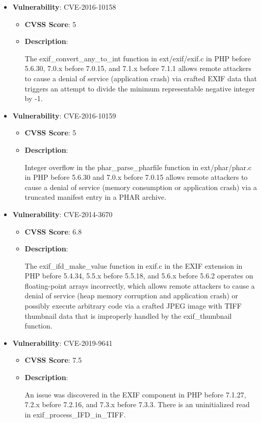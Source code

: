 \documentclass{article}
\begin{document}
\begin{itemize}
        \item \textbf{Vulnerability}: CVE-2016-10158
        \begin{itemize}
            \item \textbf{CVSS Score}:  5 
            \item \textbf{Description}:
            \parbox[t]{0.9\linewidth}{
                \ttfamily The exif\_convert\_any\_to\_int function in ext/exif/exif.c in PHP before 5.6.30, 7.0.x before 7.0.15, and 7.1.x before 7.1.1 allows remote attackers to cause a denial of service (application crash) via crafted EXIF data that triggers an attempt to divide the minimum representable negative integer by -1.
            }
        \end{itemize}
    
        \item \textbf{Vulnerability}: CVE-2016-10159
        \begin{itemize}
            \item \textbf{CVSS Score}:  5 
            \item \textbf{Description}:
            \parbox[t]{0.9\linewidth}{
                \ttfamily Integer overflow in the phar\_parse\_pharfile function in ext/phar/phar.c in PHP before 5.6.30 and 7.0.x before 7.0.15 allows remote attackers to cause a denial of service (memory consumption or application crash) via a truncated manifest entry in a PHAR archive.
            }
        \end{itemize}
    
        \item \textbf{Vulnerability}: CVE-2014-3670
        \begin{itemize}
            \item \textbf{CVSS Score}:  6.8 
            \item \textbf{Description}:
            \parbox[t]{0.9\linewidth}{
                \ttfamily The exif\_ifd\_make\_value function in exif.c in the EXIF extension in PHP before 5.4.34, 5.5.x before 5.5.18, and 5.6.x before 5.6.2 operates on floating-point arrays incorrectly, which allows remote attackers to cause a denial of service (heap memory corruption and application crash) or possibly execute arbitrary code via a crafted JPEG image with TIFF thumbnail data that is improperly handled by the exif\_thumbnail function.
            }
        \end{itemize}
    
        \item \textbf{Vulnerability}: CVE-2019-9641
        \begin{itemize}
            \item \textbf{CVSS Score}:  7.5 
            \item \textbf{Description}:
            \parbox[t]{0.9\linewidth}{
                \ttfamily An issue was discovered in the EXIF component in PHP before 7.1.27, 7.2.x before 7.2.16, and 7.3.x before 7.3.3. There is an uninitialized read in exif\_process\_IFD\_in\_TIFF.
            }
        \end{itemize}
    

\end{itemize}
\end{document}
